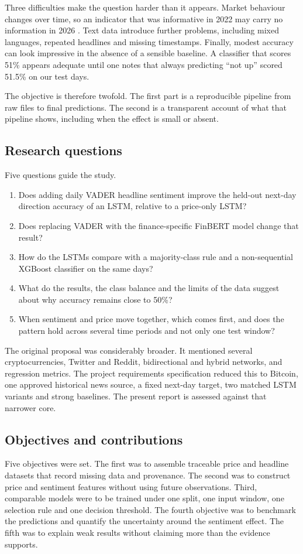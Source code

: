 Three difficulties make the question harder than it appears. Market behaviour changes over time, so an indicator that was informative in 2022 may carry no information in 2026 \cite{lo2004,cont2001}. Text data introduce further problems, including mixed languages, repeated headlines and missing timestamps. Finally, modest accuracy can look impressive in the absence of a sensible baseline. A classifier that scores 51\% appears adequate until one notes that always predicting ``not up'' scored 51.5\% on our test days.

The objective is therefore twofold. The first part is a reproducible pipeline from raw files to final predictions. The second is a transparent account of what that pipeline shows, including when the effect is small or absent.

\subsection{Research questions}
Five questions guide the study.
\begin{enumerate}[label=\textbf{RQ\arabic*.}]
\item Does adding daily VADER headline sentiment improve the held-out next-day direction accuracy of an LSTM, relative to a price-only LSTM?
\item Does replacing VADER with the finance-specific FinBERT model change that result?
\item How do the LSTMs compare with a majority-class rule and a non-sequential XGBoost classifier on the same days?
\item What do the results, the class balance and the limits of the data suggest about why accuracy remains close to 50\%?
\item When sentiment and price move together, which comes first, and does the pattern hold across several time periods and not only one test window?
\end{enumerate}
The original proposal was considerably broader. It mentioned several cryptocurrencies, Twitter and Reddit, bidirectional and hybrid networks, and regression metrics. The project requirements specification reduced this to Bitcoin, one approved historical news source, a fixed next-day target, two matched LSTM variants and strong baselines. The present report is assessed against that narrower core.

\subsection{Objectives and contributions}
Five objectives were set. The first was to assemble traceable price and headline datasets that record missing data and provenance. The second was to construct price and sentiment features without using future observations. Third, comparable models were to be trained under one split, one input window, one selection rule and one decision threshold. The fourth objective was to benchmark the predictions and quantify the uncertainty around the sentiment effect. The fifth was to explain weak results without claiming more than the evidence supports.

